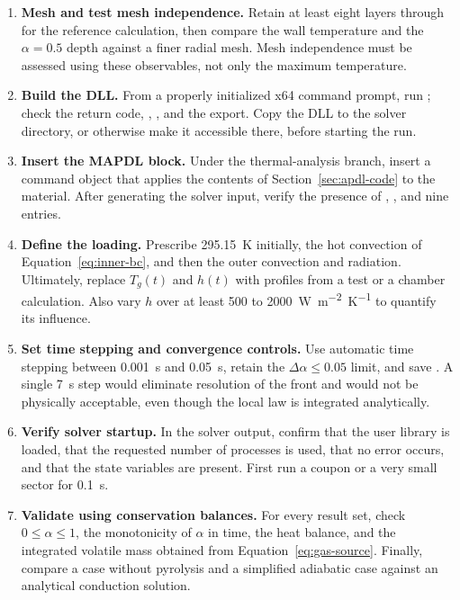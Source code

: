 \documentclass[oneside,openany]{amsdtx}
\begin{document}
\begin{enumerate}[leftmargin=2.2em,label=\textbf{\arabic*.}]
  \item \textbf{Mesh and test mesh independence.} Retain at least eight layers
  through  for the reference calculation, then compare the wall
  temperature and the \(\alpha=0{.}5\) depth against a finer radial mesh. Mesh
  independence must be assessed using these observables, not only the maximum
  temperature.

  \item \textbf{Build the DLL.} From a properly initialized x64 command prompt,
  run ; check the return code,
  , , and the  export. Copy
  the DLL to the solver directory, or otherwise make it accessible there,
  before starting the run.

  \item \textbf{Insert the MAPDL block.} Under the thermal-analysis branch,
  insert a command object that applies the contents of
  Section~\ref{sec:apdl-code} to the  material. After generating the
  solver input, verify the presence of , , and
  nine  entries.

  \item \textbf{Define the loading.} Prescribe \SI{295.15}{K} initially, the
  hot convection of Equation~\eqref{eq:inner-bc}, and then the outer convection
  and radiation. Ultimately, replace \(T_g(t)\) and \(h(t)\) with profiles from
  a test or a chamber calculation. Also vary \(h\) over at least 500 to
  \SI{2000}{W.m^{-2}.K^{-1}} to quantify its influence.

  \item \textbf{Set time stepping and convergence controls.} Use automatic
  time stepping between \SI{0.001}{s} and \SI{0.05}{s}, retain the
  \(\Delta\alpha\le0{.}05\) limit, and save . A single \SI{7}{s}
  step would eliminate resolution of the front and would not be physically
  acceptable, even though the local law is integrated analytically.

  \item \textbf{Verify solver startup.} In the solver output, confirm that the
  user library is loaded, that the requested number of processes is used, that
  no  error occurs, and that the state variables are present.
  First run a coupon or a very small sector for \SI{0.1}{s}.

  \item \textbf{Validate using conservation balances.} For every result set,
  check \(0\le\alpha\le1\), the monotonicity of \(\alpha\) in time, the heat
  balance, and the integrated volatile mass obtained from
  Equation~\eqref{eq:gas-source}. Finally, compare a case without pyrolysis and
  a simplified adiabatic case against an analytical conduction solution.
\end{enumerate}
\end{document}
